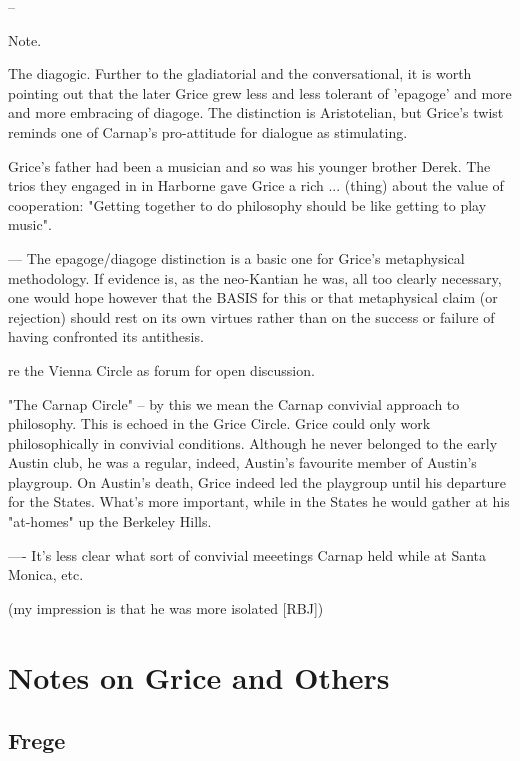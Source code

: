 \documentclass[10pt,titlepage]{book}
\begin{document}
{--
 
Note.

The diagogic. Further to the gladiatorial and the conversational, it is  
worth pointing out that the later Grice grew less and less tolerant of 
'epagoge'  and more and more embracing of diagoge. The distinction is Aristotelian, 
but  Grice's twist reminds one of Carnap's pro-attitude for dialogue as  
stimulating.
 
Grice's father had been a musician and so was his younger brother Derek.  
The trios they engaged in in Harborne gave Grice a rich ... (thing) about the 
 value of cooperation: "Getting together to do philosophy should be like 
getting  to play music".
 
---
The epagoge/diagoge distinction is a basic one for Grice's metaphysical  
methodology. If evidence is, as the neo-Kantian he was, all too clearly  
necessary, one would hope however that the BASIS for this or that metaphysical  
claim (or rejection) should rest on its own virtues rather than on the 
success  or failure of having confronted its antithesis.
  
re the Vienna Circle as forum for open discussion.
 
"The Carnap Circle" -- by this we mean the Carnap convivial approach to  
philosophy. This is echoed in the Grice Circle. Grice could only work  
philosophically in convivial conditions. Although he never belonged to the early  
Austin club, he was a regular, indeed, Austin's favourite member of Austin's  
playgroup. On Austin's death, Grice indeed led the playgroup until his 
departure  for the States. What's more important, while in the States he would 
gather at  his "at-homes" up the Berkeley Hills.
 
---- It's less clear what sort of convivial meeetings Carnap held while at  
Santa Monica, etc.

(my impression is that he was more isolated [RBJ])

\chapter{Notes on Grice and Others}

\section{Frege}

}
\end{document}
